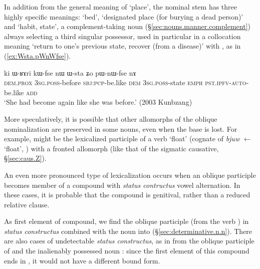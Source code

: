 In addition from the general meaning of `place', the nominal stem  has three highly specific meanings:  `bed',  `designated place (for burying a dead person)' and  `habit, state', a complement-taking noun (§\ref{sec:nouns.manner.complement}) always selecting a third singular possessor, used in particular in a collocation meaning `return to one's previous state, recover (from a disease)' with , as in (\ref{ex:Wsta.pWnWfse}).

\begin{exe}
\ex \label{ex:Wsta.pWnWfse}
\gll  ki ɯ-ʁɤri kɯ-fse nɯ ɯ-sta ʑo pɯ-nɯ-fse nɤ \\
\textsc{dem}.\textsc{prox} \textsc{3sg}.\textsc{poss}-before \textsc{sbj}:\textsc{pcp}-be.like \textsc{dem} \textsc{3sg}.\textsc{poss}-state \textsc{emph} \textsc{pst}.\textsc{ipfv}-\textsc{auto}-be.like \textsc{add} \\
\glt  `She had become again like she was before.' (2003 Kunbzang)
 \end{exe}

 


More speculatively, it is possible that other allomorphs of the oblique nominalization are preserved in some nouns, even when the base is lost. For example,  might be the lexicalized participle of a verb  `float' (cognate of  \textit{bjuw} $\leftarrow$  `float', \citealt{zhangsy19cognates}) with a fronted  allomorph (like that of the sigmatic causative, §\ref{sec:caus.Z}).

An even more pronounced type of lexicalization occurs when an oblique participle becomes member of a compound with \textit{status contructus} vowel alternation. In these cases, it is probable that the compound is genitival, rather than a reduced relative clause.

As first element of compound, we find the oblique participle  (from the verb ) in \textit{status constructus} combined with the noun  into 
 (§\ref{sec:determinative.n.n}). There are also cases of undetectable \textit{status constructus}, as in  from the oblique participle of  and the inalienably possessed noun : since the first element of this compound  ends in , it would not have a different bound form.

